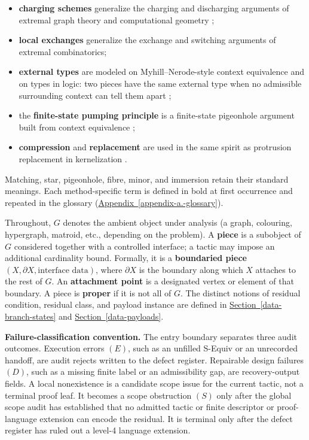 \documentclass[
  11pt,
]{article}
\providecommand{\tightlist}{%
  \setlength{\itemsep}{0pt}\setlength{\parskip}{0pt}}
\theoremstyle{definition}
\newcommand{\secref}[1]{\hyperref[#1]{Section~\ref*{#1}}}
\newcommand{\appref}[1]{\hyperref[#1]{Appendix~\ref*{#1}}}
\begin{document}
\begin{itemize}
\tightlist
\item
  \textbf{charging schemes} generalize the charging and discharging
  arguments of extremal graph theory and computational geometry
  \citep{appel-haken-1977-discharging, appel-haken-koch-1977-reducibility, cranston-west-2017-discharging};
\item
  \textbf{local exchanges} generalize the exchange and switching
  arguments of extremal combinatorics;
\item
  \textbf{external types} are modeled on Myhill--Nerode-style context
  equivalence and on types in logic: two pieces have the same external type when no
  admissible surrounding context can tell them apart
  \citep{myhill-1957-automata, nerode-1958-linear, courcelle-1990-mso-graphs, courcelle-engelfriet-2012-graph-structure};
\item
  the \textbf{finite-state pumping principle} is a finite-state
  pigeonhole argument built from context equivalence
  \citep{myhill-1957-automata, nerode-1958-linear};
\item
  \textbf{compression} and \textbf{replacement} are used in the same
  spirit as protrusion replacement in kernelization
  \citep{bodlaender-etal-2009-meta-kernelization, kim-etal-2012-protrusion, garnero-etal-2013-explicit-kernels, jansen-wulms-2016-lower-bounds}.
\end{itemize}

Matching, star, pigeonhole, fibre, minor, and immersion retain their
standard meanings. Each method-specific term is defined in bold at first
occurrence and repeated in the glossary
(\appref{appendix-a.-glossary}).

Throughout, \(G\) denotes the ambient object under analysis (a graph,
colouring, hypergraph, matroid, etc., depending on the problem). A
\textbf{piece} is a subobject of \(G\) considered together with a
controlled interface; a tactic may impose an additional cardinality
bound. Formally, it is a \textbf{boundaried piece}
\((X,\partial X, \text{interface data})\), where \(\partial X\) is the
boundary along which \(X\) attaches to the rest of \(G\). An
\textbf{attachment point} is a designated vertex or element of that
boundary. A piece is \textbf{proper} if it is not all of \(G\). The
distinct notions of residual condition, residual class, and payload
instance are defined in \secref{data-branch-states} and
\secref{data-payloads}.

\textbf{Failure-classification convention.} The entry boundary separates
three audit outcomes. Execution errors \((E)\), such as an
unfilled S-Equiv or an unrecorded handoff, are audit rejects written to
the defect register. Repairable design failures \((D)\), such as a
missing finite label or an admissibility gap, are recovery-output
fields. A local nonexistence is a candidate scope issue for the current
tactic, not a terminal proof leaf. It becomes a scope obstruction \((S)\)
only after the global scope audit has established that no admitted tactic or
finite descriptor or proof-language extension can encode the residual. It is
terminal only after the defect register has ruled out a level-4 language
extension.
\end{document}
